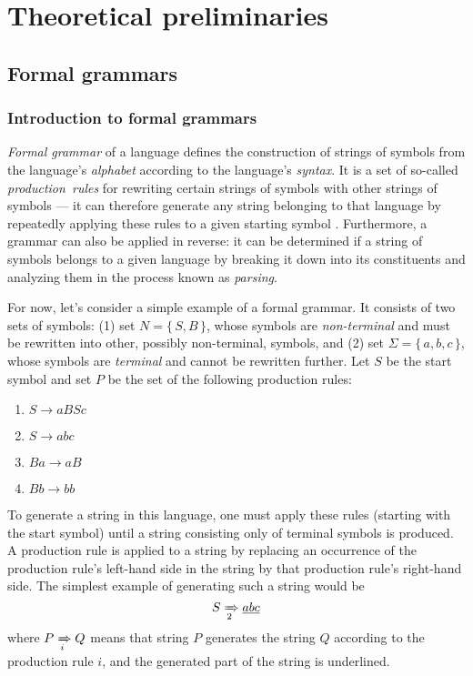 \documentclass[english,engineering]{wizthesis}
\begin{document}
\chapter{Theoretical preliminaries}

\section{Formal grammars}

\subsection{Introduction to formal grammars}

\textit{Formal grammar} of a language defines the construction of strings of
symbols from the language's \textit{alphabet} according to the language's
\textit{syntax}. It is a set of so-called \textit{production~rules} for
rewriting certain strings of symbols with other strings of symbols --- it can
therefore generate any string belonging to that language by repeatedly applying
these rules to a given starting symbol \cite{meduna-2014}. Furthermore, a
grammar can also be applied in reverse: it can be determined if a string of
symbols belongs to a given language by breaking it down into its constituents
and analyzing them in the process known as \textit{parsing}.

For now, let's consider a simple example of a formal grammar. It consists of two
sets of symbols: (1) set $N = \{\,S, B\,\}$, whose symbols are
\textit{non-terminal} and must be rewritten into other, possibly non-terminal,
symbols, and (2) set $\Sigma = \{\,a, b, c\,\}$, whose symbols are
\textit{terminal} and cannot be rewritten further. Let $S$ be the start symbol
and set $P$ be the set of the following production rules:
\begin{enumerate}[noitemsep]
  \item $S \rightarrow aBSc$
  \item $S \rightarrow abc$
  \item $Ba \rightarrow aB$
  \item $Bb \rightarrow bb$
\end{enumerate}
To generate a string in this language, one must apply these rules (starting with
the start symbol) until a string consisting only of terminal symbols is
produced. A production rule is applied to a string by replacing an occurrence
of the production rule's left-hand side in the string by that production rule's
right-hand side. The simplest example of generating such a string would be
\begin{equation*}
  S \xRightarrow[2]{} \underline{abc}
\end{equation*}
where $P \xRightarrow[i]{} Q$ means that string $P$ generates the string $Q$
according to the production rule $i$, and the generated part of the string
is underlined.
\end{document}
